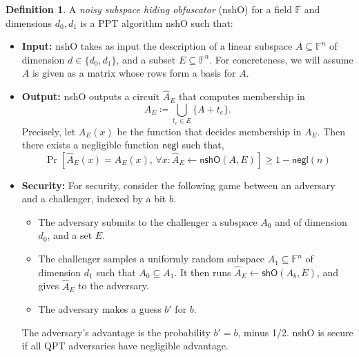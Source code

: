 \documentclass[12pt,letterpaper]{article}
\theoremstyle{definition}
\newtheorem{defn}[theorem]{Definition}
\theoremstyle{remark}
\begin{document}
\begin{defn}
A \emph{noisy subspace hiding obfuscator} (\textsf{nshO}) for a field $\mathbb{F}$ and dimensions $d_0,d_1$ is a PPT algorithm \textsf{nshO} such that:
\begin{itemize}
    \item \textbf{Input:} \textsf{nshO} takes as input the description of a linear subspace $A \subseteq \mathbb{F}^n$ of dimension $d \in \{d_0,d_1\}$, and a subset $E \subseteq \mathbb{F}^n$. For concreteness, we will assume $A$ is given as a matrix whose rows form a basis for $A$.
    \item \textbf{Output:} \textsf{nshO} outputs a circuit $\hat{A}_E$ that computes membership in 
    \begin{equation*}
        A_E \coloneqq \bigcup_{t_e \in E} \{A+t_e\}.
    \end{equation*}
    Precisely, let $A_E(x)$ be the function that decides membership in $A_E$. Then there exists a negligible function $\textsf{negl}$ such that,
    \begin{equation*}
        \Pr[\hat{A}_E(x)=A_E(x), \, \forall x: \hat{A}_E \leftarrow \textsf{nshO}(A,E)] \geq 1-\textsf{negl}(n)
    \end{equation*}
    \item \textbf{Security:} For security, consider the following game between an adversary and a challenger, indexed by a bit $b$.
    \begin{itemize}
        \item The adversary submits to the challenger a subspace $A_0$ and of dimension $d_0$, and a set $E$.
        \item The challenger samples a uniformly random subspace $A_1 \subseteq \mathbb{F}^n$ of dimension $d_1$ such that $A_0 \subseteq A_1$. It then runs $\hat{A}_E \leftarrow \textsf{shO}(A_b, E)$, and gives $\hat{A}_E$ to the adversary.
        \item The adversary makes a guess $b'$ for $b$.
    \end{itemize}
    The adversary's advantage is the probability $b'=b$, minus 1/2. \textsf{nshO} is secure if all QPT adversaries have negligible advantage.
\end{itemize}
\end{defn}





\end{document}
